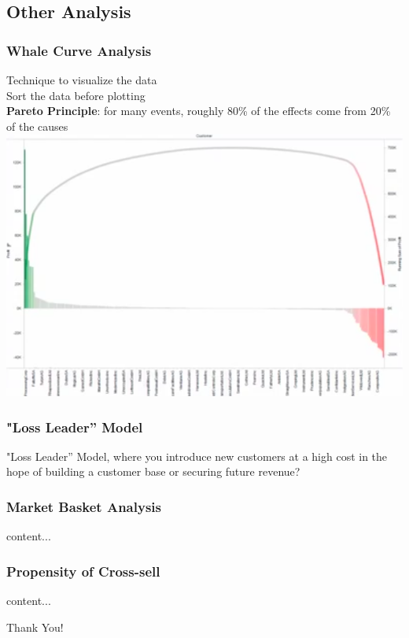 \documentclass{beamer}
\begin{document}
\subsection{Other Analysis}
\begin{frame}\frametitle{Whale Curve Analysis}
	Technique to visualize the data\\
	Sort the data before plotting\\
	\textbf{Pareto Principle}: for many events, roughly 80\% of the effects come from 20\% of the causes\\
	\includegraphics[scale=0.3]{other/whalecurve}
	
\end{frame}

\begin{frame}\frametitle{"Loss Leader” Model}

"Loss Leader” Model, where you introduce new customers at a high cost in the hope of building a customer base or securing future revenue? 

\end{frame}

\begin{frame}\frametitle{Market Basket Analysis}
	content...
\end{frame}

\begin{frame}\frametitle{Propensity of Cross-sell}
content...
\end{frame}


\begin{frame}
	Thank You!
\end{frame}
\end{document}
